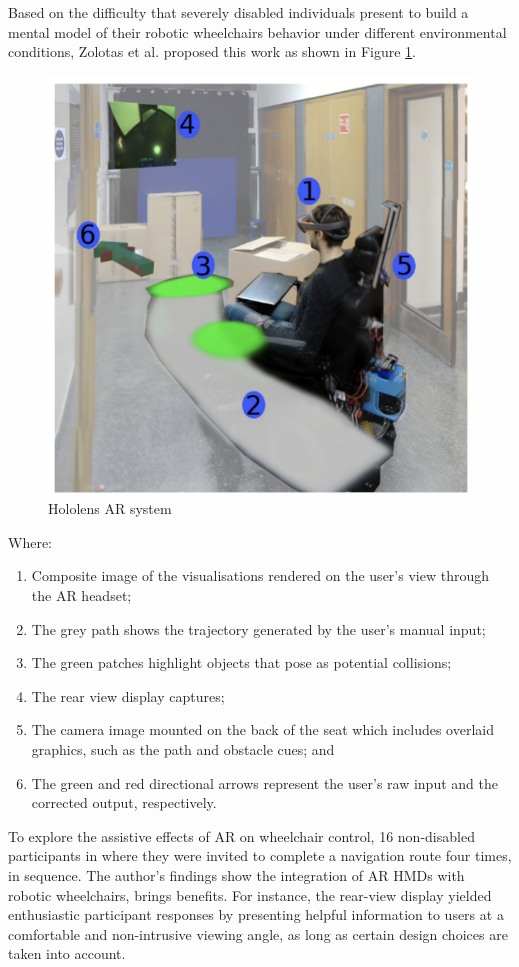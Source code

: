 Based on the difficulty that severely disabled individuals present to build a mental model of their robotic wheelchairs behavior under different environmental conditions, Zolotas et al. \cite{zolotas2018} proposed this work as shown in Figure \ref{fig:zolotas2018}.

\begin{figure}[!hbt]
\begin{center}
\includegraphics[width=0.7 \textwidth]{img/cap3/zolotas2018}
\caption{Hololens AR system \cite{zolotas2018}}
\label{fig:zolotas2018}
\end{center}
\end{figure}

Where: 
\begin{enumerate}
\item Composite image of the visualisations rendered on the
user’s view through the AR headset;
\item The grey path shows the trajectory generated by the user’s manual input;
\item The green patches highlight objects that pose as potential collisions;
\item The rear view display captures;
\item The camera image mounted on the back of the seat which includes overlaid graphics, such as the path and obstacle cues; and
\item The green and red directional arrows represent the user’s raw input and the corrected output, respectively.
\end{enumerate}

To explore the assistive effects of AR on wheelchair control, 16 non-disabled participants in where they were invited to complete a navigation route four times, in sequence.
The author's findings show the integration of AR HMDs with robotic wheelchairs, brings benefits. For instance, the rear-view display yielded enthusiastic participant responses by presenting helpful information to users at a comfortable and non-intrusive viewing angle, as long as certain design choices are taken into account.


